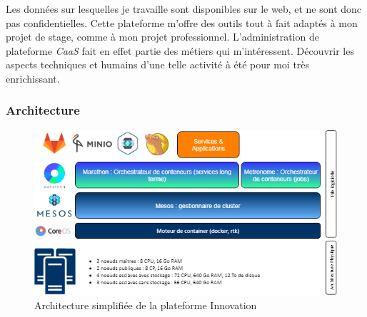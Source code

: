 Les données sur lesquelles je travaille sont disponibles sur le web, et ne sont donc pas confidentielles. Cette plateforme m'offre des outils tout à fait adaptés à mon projet de stage, comme à mon projet professionnel. L'administration de plateforme \textit{CaaS} fait en effet partie des métiers qui m'intéressent. Découvrir les aspects techniques et humains d'une telle activité à été pour moi très enrichissant.
\label{section 2.2.1}

\subsubsection*{Architecture}
\vspace{10pt}
\begin{figure}[H]
  \centering
  \includegraphics[scale=0.70]{images/Archi-inno.png}
  \caption{Architecture simplifiée de la plateforme Innovation}
  \label{fig:une-image}
\end{figure}
\vspace{10pt}

